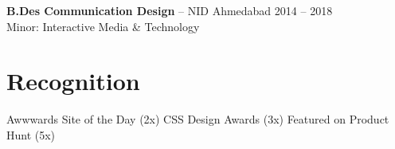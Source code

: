 \documentclass[10pt,letterpaper]{article}
\begin{document}
\textbf{B.Des Communication Design} -- NID Ahmedabad \hfill 2014 -- 2018\\
{\small Minor: Interactive Media \& Technology}

\vspace{12pt}

\section{Recognition}

\hspace{4pt} Awwwards Site of the Day (2x) \quad
{}\hspace{4pt} CSS Design Awards (3x) \quad
{}\hspace{4pt} Featured on Product Hunt (5x)
\end{document}

